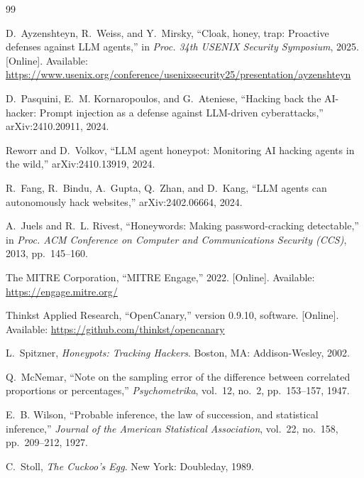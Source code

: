 \documentclass[conference]{IEEEtran}
\begin{document}
\begin{thebibliography}{99}

D.~Ayzenshteyn, R.~Weiss, and Y.~Mirsky, ``Cloak, honey, trap: Proactive defenses against {LLM} agents,'' in \emph{Proc. 34th USENIX Security Symposium}, 2025. [Online]. Available: \url{https://www.usenix.org/conference/usenixsecurity25/presentation/ayzenshteyn}

D.~Pasquini, E.~M. Kornaropoulos, and G.~Ateniese, ``Hacking back the {AI}-hacker: Prompt injection as a defense against {LLM}-driven cyberattacks,'' arXiv:2410.20911, 2024.

Reworr and D.~Volkov, ``{LLM} agent honeypot: Monitoring {AI} hacking agents in the wild,'' arXiv:2410.13919, 2024.

R.~Fang, R.~Bindu, A.~Gupta, Q.~Zhan, and D.~Kang, ``{LLM} agents can autonomously hack websites,'' arXiv:2402.06664, 2024.

A.~Juels and R.~L. Rivest, ``Honeywords: Making password-cracking detectable,'' in \emph{Proc. ACM Conference on Computer and Communications Security (CCS)}, 2013, pp.~145--160.

The MITRE Corporation, ``MITRE Engage,'' 2022. [Online]. Available: \url{https://engage.mitre.org/}

Thinkst Applied Research, ``OpenCanary,'' version 0.9.10, software. [Online]. Available: \url{https://github.com/thinkst/opencanary}

L.~Spitzner, \emph{Honeypots: Tracking Hackers}. Boston, MA: Addison-Wesley, 2002.

Q.~McNemar, ``Note on the sampling error of the difference between correlated proportions or percentages,'' \emph{Psychometrika}, vol.~12, no.~2, pp.~153--157, 1947.

E.~B. Wilson, ``Probable inference, the law of succession, and statistical inference,'' \emph{Journal of the American Statistical Association}, vol.~22, no.~158, pp.~209--212, 1927.

C.~Stoll, \emph{The Cuckoo's Egg}. New York: Doubleday, 1989.

\end{thebibliography}
\end{document}

